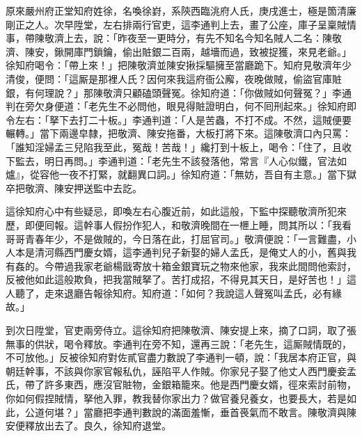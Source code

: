 原來嚴州府正堂知府姓徐，名喚徐崶，系陝西臨洮府人氏，庚戌進士，極是箇清廉剛正之人。次早陞堂，左右排兩行官吏，這李通判上去，畫了公座，庫子呈稟賊情事，帶陳敬濟上去，說：「昨夜至一更時分，有先不知名今知名賊人二名：陳敬濟、陳安，鍬開庫門鎖鑰，偷出賍銀二百兩，越墻而過，致被捉獲，來見老爺。」徐知府喝令：「帶上來！」把陳敬濟並陳安揪採驅擁至當廳跪下。知府見敬濟年少清俊，{}便問：「這厮是那裡人氏？因何來我這府衙公廨，夜晚做賊，偷盜官庫賍銀，有何理說？」那陳敬濟只顧磕頭聲冤。徐知府道：「你做賊如何聲冤？」李通判在旁欠身便道：「老先生不必問他，眼見得賍證明白，何不囘刑起來。」徐知府即令左右：「拏下去打二十板。」李通判道：「人是苦蟲，不打不成。不然，這賊便要輾轉。」當下兩邊皁隸，把敬濟、陳安拖番，大板打將下來。這陳敬濟口內只罵：「誰知淫婦孟三兒陷我至此，冤哉！苦哉！」{}{}纔打到十板上，喝令：「住了，且收下監去，明日再問。」李通判道：「老先生不該發落他，常言『人心似鐵，官法如爐』，從容他一夜不打緊，就翻異口詞。」徐知府道：「無妨，吾自有主意。」當下獄卒把敬濟、陳安押送監中去訖。

這徐知府心中有些疑忌，即喚左右心腹近前，如此這般，下監中探聽敬濟所犯來歷，{}即便囘報。這幹事人假扮作犯人，和敬濟晚間在一㭱上睡，問其所以：「我看哥哥青春年少，不是做賊的，今日落在此，打屈官司。」敬濟便說：「一言難盡，小人本是清河縣西門慶女婿，這李通判兒子新娶的婦人孟氏，是俺丈人的小，舊與我有姦的。今帶過我家老爺楊戩寄放十箱金銀寶玩之物來他家，我來此間問他索討，反被他如此這般欺負，把我當賊拏了。苦打成招，不得見其天日，是好苦也！」這人聽了，走來退廳告報徐知府。知府道：「如何？我說這人聲冤叫孟氏，必有緣故。」{}

到次日陞堂，官吏兩旁侍立。這徐知府把陳敬濟、陳安提上來，摘了口詞，取了張無事的供狀，喝令釋放。李通判在旁不知，還再三說：「老先生，這厮賊情既的，不可放他。」反被徐知府對佐貳官盡力數說了李通判一頓，說：「我居本府正官，與朝廷幹事，不該與你家官報私仇，誣陷平人作賊。你家兒子娶了他丈人西門慶妾孟氏，帶了許多東西，應沒官賍物，金銀箱籠來。他是西門慶女婿，徑來索討前物，你如何假捏賊情，拏他入罪，教我替你家出力？做官養兒養女，也要長大，若是如此，公道何堪？」{}當廳把李通判數說的滿面羞慚，垂首䘮氣而不敢言。陳敬濟與陳安便釋放出去了。良久，徐知府退堂。

